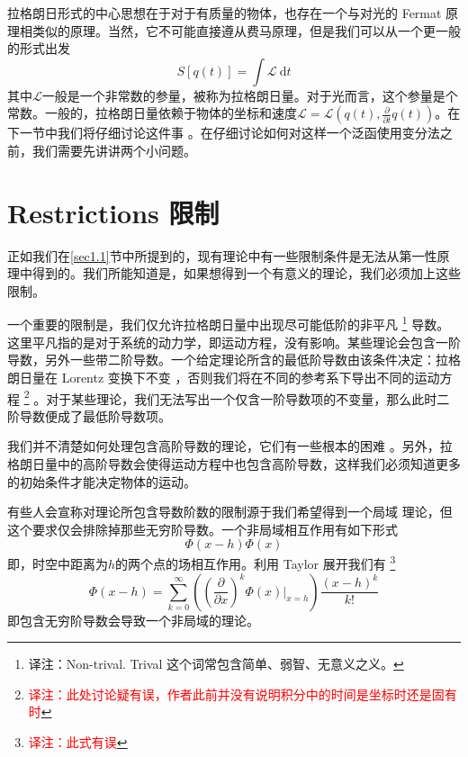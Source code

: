 拉格朗日形式的中心思想在于对于有质量的物体，也存在一个与对光的 Fermat 原理相类似的原理。当然，它不可能直接遵从费马原理，但是我们可以从一个更一般的形式出发
\[
S[q(t)]=\int {\mathcal L}~{\mathrm d}t
\]
其中\(\mathcal L\)一般是一个非常数的参量，被称为拉格朗日量。对于光而言，这个参量是个常数。一般的，拉格朗日量依赖于物体的坐标和速度\({\mathcal L}={\mathcal L}(q(t),\frac{\partial}{\partial t} q(t))\)。在下一节中我们将仔细讨论这件事%
%
。在仔细讨论如何对这样一个泛函使用变分法之前，我们需要先讲讲两个小问题。

\section[限制]{Restrictions \quad 限制}\label{sec4.2}
正如我们在\ref{sec1.1}节中所提到的，现有理论中有一些限制条件是无法从第一性原理中得到的。我们所能知道是，如果想得到一个有意义的理论，我们必须加上这些限制。

一个重要的限制是，我们仅允许拉格朗日量中出现尽可能低阶的非平凡%
\footnote{译注：Non-trival. Trival 这个词常包含简单、弱智、无意义之义。}%
导数。这里平凡指的是对于系统的动力学，即运动方程，没有影响。某些理论会包含一阶导数，另外一些带二阶导数。一个给定理论所含的最低阶导数由该条件决定：拉格朗日量在 Lorentz 变换下不变%
%
，否则我们将在不同的参考系下导出不同的运动方程%
\footnote{\textcolor{red}{译注：此处讨论疑有误，作者此前并没有说明积分中的时间是坐标时还是固有时}}%
。对于某些理论，我们无法写出一个仅含一阶导数项的不变量，那么此时二阶导数便成了最低阶导数项。

我们并不清楚如何处理包含高阶导数的理论，它们有一些根本的困难%
%
。另外，拉格朗日量中的高阶导数会使得运动方程中也包含高阶导数，这样我们必须知道更多的初始条件才能决定物体的运动。

有些人会宣称对理论所包含导数阶数的限制源于我们希望得到一个局域%
%
理论，但这个要求仅会排除掉那些无穷阶导数。一个非局域相互作用有如下形式%
\begin{equation}
\Phi(x-h)\Phi(x)
\end{equation}
即，时空中距离为\(h\)的两个点的场相互作用。利用 Taylor 展开我们有%
\footnote{\textcolor{red}{译注：此式有误}}
\begin{equation}
\Phi(x-h) = \sum\limits_{k=0}^{\infty}\left(\left(\frac{\partial}{\partial x}\right)^k\left.\Phi(x)\right|_{x=h}\right) \frac{(x-h)^k}{k!}
\end{equation}
即包含无穷阶导数会导致一个非局域的理论。

